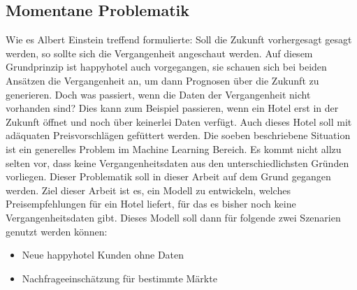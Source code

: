 \subsection{Momentane Problematik}
\label{subsec:problematik}
Wie es Albert Einstein treffend formulierte: Soll die Zukunft vorhergesagt gesagt werden, so sollte sich die Vergangenheit angeschaut werden. Auf diesem Grundprinzip ist happyhotel auch vorgegangen, sie schauen sich bei beiden Ansätzen die Vergangenheit an, um dann Prognosen über die Zukunft zu generieren. 
\newline
\newline
Doch was passiert, wenn die Daten der Vergangenheit nicht vorhanden sind? Dies kann zum Beispiel passieren, wenn ein Hotel erst in der Zukunft öffnet und noch über keinerlei Daten verfügt. Auch dieses Hotel soll mit adäquaten Preisvorschlägen gefüttert werden.
Die soeben beschriebene Situation ist ein generelles Problem im Machine Learning Bereich. Es kommt nicht allzu selten vor, dass keine Vergangenheitsdaten aus den unterschiedlichsten Gründen vorliegen. Dieser Problematik soll in dieser Arbeit auf dem Grund gegangen werden. 
\newline
\newline
Ziel dieser Arbeit ist es,  ein Modell zu entwickeln, welches Preisempfehlungen für ein Hotel liefert, für das es bisher noch keine Vergangenheitsdaten gibt. Dieses Modell soll dann für folgende zwei Szenarien genutzt werden können:
\begin{itemize}
    \item Neue happyhotel Kunden ohne Daten
    \item Nachfrageeinschätzung für bestimmte Märkte
\end{itemize}